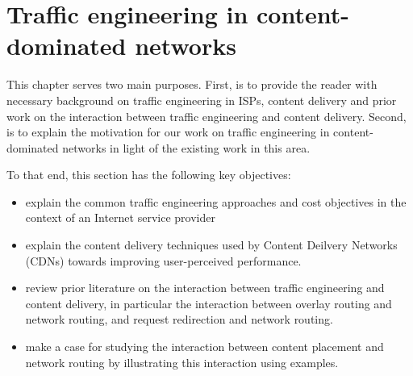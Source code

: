 \chapter{Traffic engineering in content-dominated networks}
\label{ch:te-background}

This chapter serves two main purposes. First, is to provide the reader with necessary background on traffic engineering in ISPs, content delivery and prior work on the interaction between traffic engineering and content delivery. Second, is to explain the motivation for our work on traffic engineering in content-dominated networks in light of the existing work in this area.

To that end, this section has the following key objectives:
\begin{itemize}
	\item
	explain the common traffic engineering approaches and cost objectives in the context of an Internet service provider
	\item
	explain the content delivery techniques used by Content Deilvery Networks (CDNs) towards improving user-perceived performance.
	\item
	review prior literature on the interaction between traffic engineering and content delivery, in particular the interaction between overlay routing and network routing, and request redirection and network routing.
	\item
	make a case for studying the interaction between content placement and network routing by illustrating this interaction using examples. 
\end{itemize}







